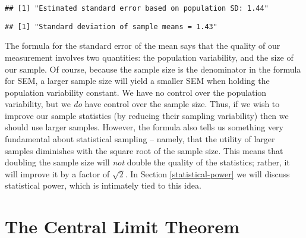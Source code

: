 \documentclass[]{book}
\newenvironment{Shaded}{\begin{snugshade}}{\end{snugshade}}
\newcommand{\KeywordTok}[1]{\textcolor[rgb]{0.13,0.29,0.53}{\textbf{#1}}}
\newcommand{\StringTok}[1]{\textcolor[rgb]{0.31,0.60,0.02}{#1}}
\newcommand{\CommentTok}[1]{\textcolor[rgb]{0.56,0.35,0.01}{\textit{#1}}}
\newcommand{\OperatorTok}[1]{\textcolor[rgb]{0.81,0.36,0.00}{\textbf{#1}}}
\newcommand{\NormalTok}[1]{#1}
\theoremstyle{definition}
\theoremstyle{definition}
\theoremstyle{definition}
\theoremstyle{remark}
\begin{document}
\begin{Shaded}
\end{Shaded}

\begin{verbatim}
## [1] "Estimated standard error based on population SD: 1.44"
\end{verbatim}

\begin{Shaded}
\end{Shaded}

\begin{verbatim}
## [1] "Standard deviation of sample means = 1.43"
\end{verbatim}

The formula for the standard error of the mean says that the quality of
our measurement involves two quantities: the population variability, and
the size of our sample. Of course, because the sample size is the
denominator in the formula for SEM, a larger sample size will yield a
smaller SEM when holding the population variability constant. We have no
control over the population variability, but we \emph{do} have control
over the sample size. Thus, if we wish to improve our sample statistics
(by reducing their sampling variability) then we should use larger
samples. However, the formula also tells us something very fundamental
about statistical sampling -- namely, that the utility of larger samples
diminishes with the square root of the sample size. This means that
doubling the sample size will \emph{not} double the quality of the
statistics; rather, it will improve it by a factor of \(\sqrt{2}\). In
Section \ref{statistical-power} we will discuss statistical power, which
is intimately tied to this idea.

\section{The Central Limit Theorem}\label{the-central-limit-theorem}
\end{document}
